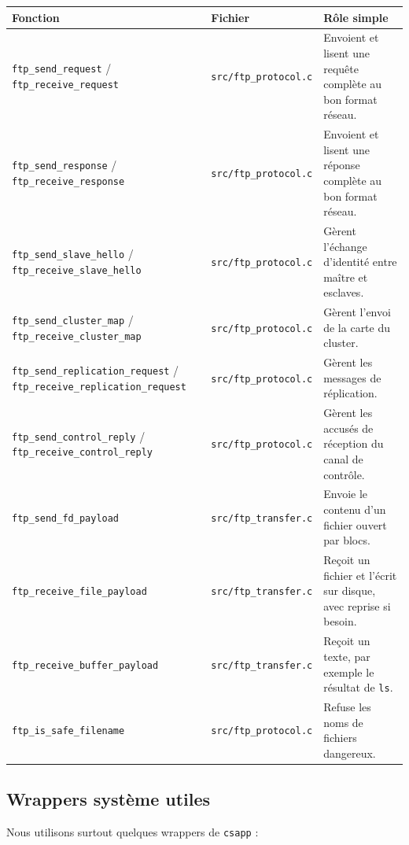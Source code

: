 \documentclass[a4paper,11pt]{article}
\newcommand{\codecell}[1]{{\footnotesize\nolinkurl{#1}}}
\begin{document}
\begin{center}
\small
\begin{tabularx}{\textwidth}{@{}L{0.30\textwidth}L{0.22\textwidth}L{0.40\textwidth}@{}}
\toprule
\textbf{Fonction} & \textbf{Fichier} & \textbf{Rôle simple} \\
\midrule
\codecell{ftp_send_request} / \codecell{ftp_receive_request} & \codecell{src/ftp_protocol.c} & Envoient et lisent une requête complète au bon format réseau. \\
\codecell{ftp_send_response} / \codecell{ftp_receive_response} & \codecell{src/ftp_protocol.c} & Envoient et lisent une réponse complète au bon format réseau. \\
\codecell{ftp_send_slave_hello} / \codecell{ftp_receive_slave_hello} & \codecell{src/ftp_protocol.c} & Gèrent l'échange d'identité entre maître et esclaves. \\
\codecell{ftp_send_cluster_map} / \codecell{ftp_receive_cluster_map} & \codecell{src/ftp_protocol.c} & Gèrent l'envoi de la carte du cluster. \\
\codecell{ftp_send_replication_request} / \codecell{ftp_receive_replication_request} & \codecell{src/ftp_protocol.c} & Gèrent les messages de réplication. \\
\codecell{ftp_send_control_reply} / \codecell{ftp_receive_control_reply} & \codecell{src/ftp_protocol.c} & Gèrent les accusés de réception du canal de contrôle. \\
\codecell{ftp_send_fd_payload} & \codecell{src/ftp_transfer.c} & Envoie le contenu d'un fichier ouvert par blocs. \\
\codecell{ftp_receive_file_payload} & \codecell{src/ftp_transfer.c} & Reçoit un fichier et l'écrit sur disque, avec reprise si besoin. \\
\codecell{ftp_receive_buffer_payload} & \codecell{src/ftp_transfer.c} & Reçoit un texte, par exemple le résultat de \texttt{ls}. \\
\codecell{ftp_is_safe_filename} & \codecell{src/ftp_protocol.c} & Refuse les noms de fichiers dangereux. \\
\bottomrule
\end{tabularx}
\end{center}

\subsection{Wrappers système utiles}

Nous utilisons surtout quelques wrappers de \texttt{csapp} :
\end{document}
